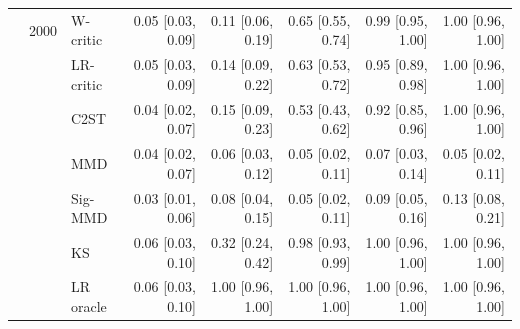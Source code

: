 \begin{tabular}{lllrrrrr}
 & 2000 & W-critic & 0.05 [0.03, 0.09] & 0.11 [0.06, 0.19] & 0.65 [0.55, 0.74] & 0.99 [0.95, 1.00] & 1.00 [0.96, 1.00] \\
 &  & LR-critic & 0.05 [0.03, 0.09] & 0.14 [0.09, 0.22] & 0.63 [0.53, 0.72] & 0.95 [0.89, 0.98] & 1.00 [0.96, 1.00] \\
 &  & C2ST & 0.04 [0.02, 0.07] & 0.15 [0.09, 0.23] & 0.53 [0.43, 0.62] & 0.92 [0.85, 0.96] & 1.00 [0.96, 1.00] \\
 &  & MMD & 0.04 [0.02, 0.07] & 0.06 [0.03, 0.12] & 0.05 [0.02, 0.11] & 0.07 [0.03, 0.14] & 0.05 [0.02, 0.11] \\
 &  & Sig-MMD & 0.03 [0.01, 0.06] & 0.08 [0.04, 0.15] & 0.05 [0.02, 0.11] & 0.09 [0.05, 0.16] & 0.13 [0.08, 0.21] \\
 &  & KS & 0.06 [0.03, 0.10] & 0.32 [0.24, 0.42] & 0.98 [0.93, 0.99] & 1.00 [0.96, 1.00] & 1.00 [0.96, 1.00] \\
 &  & LR oracle & 0.06 [0.03, 0.10] & 1.00 [0.96, 1.00] & 1.00 [0.96, 1.00] & 1.00 [0.96, 1.00] & 1.00 [0.96, 1.00] \\
\bottomrule
\end{tabular}
